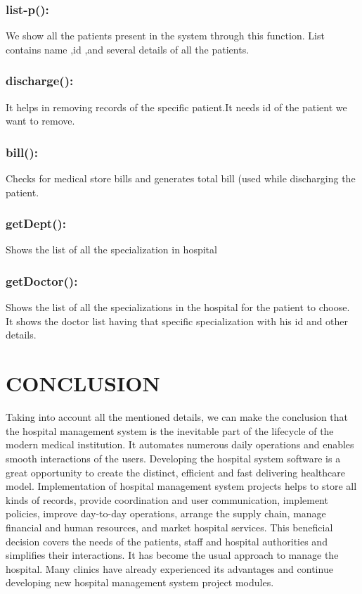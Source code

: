 \documentclass[a4paper, 14pt]{report}
\begin{document}
{\subsection{list-p():}
We show all the patients present in the system through this function. List contains name ,id ,and several details of all the patients.

\subsection{discharge():}
It helps in removing records of the specific patient.It needs id of the patient we want to remove.

\subsection{bill():}
Checks for medical store bills and generates total bill (used while discharging the patient.

\subsection{getDept():}
Shows the list of all the specialization in hospital

\subsection{getDoctor():}
Shows the list of all the specializations in the hospital for the patient to choose. It shows the doctor list having that specific specialization with his id and other details.

\newpage

\chapter{CONCLUSION}
Taking into account all the mentioned details, we can make the conclusion that the hospital management system is the inevitable part of the lifecycle of the modern medical institution. It automates numerous daily operations and enables smooth interactions of the users. Developing the hospital system software is a great opportunity to create the distinct, efficient and fast delivering healthcare model. Implementation of hospital management system projects helps to store all kinds of records, provide coordination and user communication, implement policies, improve day-to-day operations, arrange the supply chain, manage financial and human resources, and market hospital services. This beneficial decision covers the needs of the patients, staff and hospital authorities and simplifies their interactions. It has become the usual approach to manage the hospital. Many clinics have already experienced its advantages and continue developing new hospital management system project modules.


}
\end{document}
